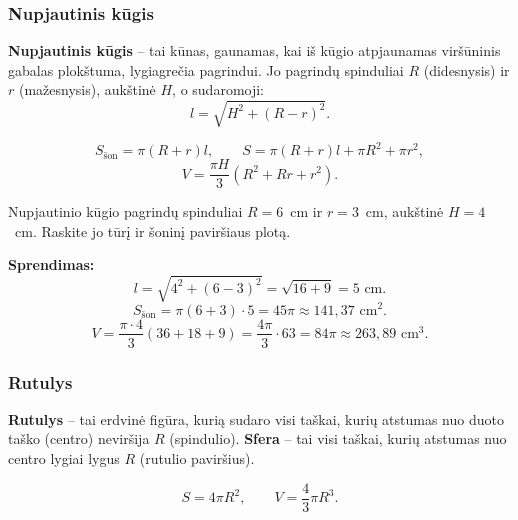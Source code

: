 \subsubsection*{Nupjautinis kūgis}

\begin{definition}
\textbf{Nupjautinis kūgis} -- tai kūnas, gaunamas, kai iš kūgio atpjaunamas viršūninis gabalas plokštuma, lygiagrečia pagrindui. Jo pagrindų spinduliai $R$ (didesnysis) ir $r$ (mažesnysis), aukštinė $H$, o sudaromoji:
\[
l = \sqrt{H^2 + (R - r)^2}.
\]
\end{definition}

\begin{theorem}
\[
S_{\text{šon}} = \pi(R + r)l, \qquad S = \pi(R + r)l + \pi R^2 + \pi r^2,
\]
\[
V = \frac{\pi H}{3}(R^2 + Rr + r^2).
\]
\end{theorem}

\begin{example}
Nupjautinio kūgio pagrindų spinduliai $R = 6$~cm ir $r = 3$~cm, aukštinė $H = 4$~cm. Raskite jo tūrį ir šoninį paviršiaus plotą.

\textbf{Sprendimas:}
\[
l = \sqrt{4^2 + (6-3)^2} = \sqrt{16 + 9} = 5 \text{ cm}.
\]
\[
S_{\text{šon}} = \pi(6 + 3) \cdot 5 = 45\pi \approx 141{,}37 \text{ cm}^2.
\]
\[
V = \frac{\pi \cdot 4}{3}(36 + 18 + 9) = \frac{4\pi}{3} \cdot 63 = 84\pi \approx 263{,}89 \text{ cm}^3.
\]
\end{example}

\subsubsection*{Rutulys}

\begin{definition}
\textbf{Rutulys} -- tai erdvinė figūra, kurią sudaro visi taškai, kurių atstumas nuo duoto taško (centro) neviršija $R$ (spindulio). \textbf{Sfera} -- tai visi taškai, kurių atstumas nuo centro lygiai lygus $R$ (rutulio paviršius).
\end{definition}

\begin{theorem}
\[
S = 4\pi R^2, \qquad V = \frac{4}{3}\pi R^3.
\]
\end{theorem}

